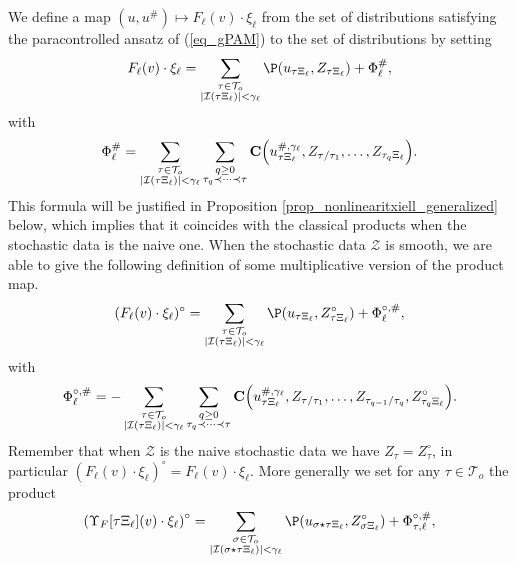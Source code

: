 \documentclass[11pt]{preprint}
\newcommand{\mcI}{\mathcal{I}}
\newcommand{\mcZ}{\mathcal{Z}}
\newcommand{\mcT}{\mathcal{T}}
\def\eqref#1{(\ref{#1})}
\begin{document}
	We define a map $(u,u^\#) \mapsto F_\ell(v)\cdot\xi_\ell$ from the set of distributions satisfying the paracontrolled ansatz of \eqref{eq_gPAM} to the set of distributions by setting
	\begin{equation}\label{eqdef_Produit_Fluxil1}
		F_\ell(v)\cdot\xi_\ell = \sum_{\substack{\tau\in\mcT_o \\ |\mcI(\tau\Xi_\ell) |<\gamma_\ell  }  } \P(u_{\tau\Xi_\ell}, Z_{\tau\Xi_\ell} ) + \Phi_\ell^\#,
	\end{equation}
	with
	\begin{equation}\label{eqdef_Produit_Fluxil2}
		\Phi_\ell^\# = \sum_{\substack{\tau\in\mcT_o \\ |\mcI(\tau\Xi_\ell)| <\gamma_\ell  }  } \sum_{ \substack{q\geq 0 \\ \tau_q\prec\dots\prec \tau}} {\bf C} \Big(u^{\#,\gamma_\ell}_{\tau\Xi_\ell},Z_{\tau/\tau_1}, \dots, Z_{\tau_q\Xi_\ell}\Big) .
	\end{equation}
	This formula will be justified in Proposition \ref{prop_nonlinearitxiell_generalized} below, which implies that it coincides with the classical products when the stochastic data is the naive one.
	When the stochastic data $\mcZ$ is smooth, we are able to give the following definition of some multiplicative version of the product map.
		\begin{equation}\label{eqdef_Produit_Fluxil1_mult}
		(F_\ell(v)\cdot\xi_\ell)^\circ = \sum_{\substack{\tau\in\mcT_o \\ |\mcI(\tau\Xi_\ell) |<\gamma_\ell  }  } \P(u_{\tau\Xi_\ell}, Z_{\tau\Xi_\ell}^\circ ) + \Phi_\ell^{\circ,\#},
	\end{equation}
	with
	\begin{equation}\label{eqdef_Produit_Fluxil2_mult}
		\Phi_\ell^{\circ,\#} = - \sum_{\substack{\tau\in\mcT_o \\ |\mcI(\tau\Xi_\ell)| <\gamma_\ell  }  } \sum_{ \substack{q\geq 0 \\ \tau_q\prec\dots\prec \tau}} {\bf C} \Big( u^{\#,\gamma_\ell}_{\tau\Xi_\ell},Z_{\tau/\tau_1}, \dots,Z_{\tau_{q-1}/\tau_q} ,Z_{\tau_q\Xi_\ell}^\circ\Big) .
	\end{equation}
Remember that when $\mcZ$ is the naive stochastic data we have $Z_\tau=Z^\circ_\tau$, in particular $(F_\ell(v)\cdot\xi_\ell)^\circ = F_\ell(v)\cdot\xi_\ell$.
		More generally we set for any $\tau\in\mcT_o$ the product
		\begin{equation}\label{eqdef_Produit_ElementaryDiff1}
			\left(\Upsilon_F[\tau\Xi_\ell](v) \cdot \xi_\ell\right)^{\circ} = \sum_{ \substack{\sigma\in\mcT_o \\ |\mcI(\sigma \star \tau\Xi_\ell)|<\gamma_\ell}} \P(u_{\sigma \star \tau\Xi_\ell}, Z^{\circ}_{\sigma\Xi_\ell} ) + \Phi_{\tau,\ell}^{\circ,\#},
		\end{equation}
\end{document}
